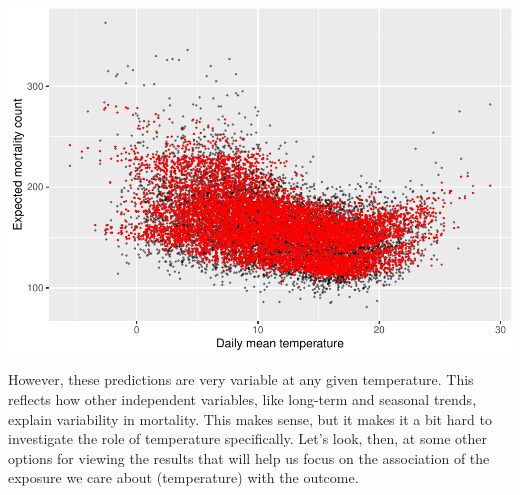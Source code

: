 \documentclass[
]{book}
\newenvironment{Shaded}{\begin{snugshade}}{\end{snugshade}}
\newcommand{\DataTypeTok}[1]{\textcolor[rgb]{0.13,0.29,0.53}{#1}}
\newcommand{\FloatTok}[1]{\textcolor[rgb]{0.00,0.00,0.81}{#1}}
\newcommand{\KeywordTok}[1]{\textcolor[rgb]{0.13,0.29,0.53}{\textbf{#1}}}
\newcommand{\NormalTok}[1]{#1}
\newcommand{\OperatorTok}[1]{\textcolor[rgb]{0.81,0.36,0.00}{\textbf{#1}}}
\newcommand{\StringTok}[1]{\textcolor[rgb]{0.31,0.60,0.02}{#1}}
\begin{document}
\begin{Shaded}
\end{Shaded}

\includegraphics{adv_epi_analysis_files/figure-latex/unnamed-chunk-61-1.pdf}

However, these predictions are very variable at any given temperature. This reflects how
other independent variables, like long-term and seasonal trends, explain variability in
mortality. This makes sense, but it makes it a bit hard to investigate the role of temperature
specifically. Let's look, then, at some other options for viewing the results that will
help us focus on the association of the exposure we care about (temperature) with the outcome.
\end{document}
